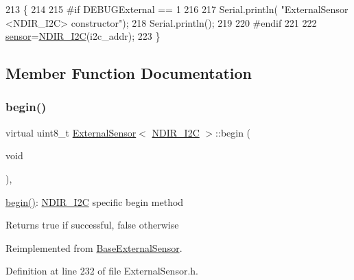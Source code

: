 \begin{DoxyCode}
213     \{
214     
215 \textcolor{preprocessor}{    #if DEBUGExternal == 1 }
216 
217         Serial.println( \textcolor{stringliteral}{"ExternalSensor <NDIR\_I2C> constructor"});
218         Serial.println();
219     
220 \textcolor{preprocessor}{    #endif}
221 
222         \hyperlink{class_external_sensor_3_01_n_d_i_r___i2_c_01_4_ae541c9cece7c38674b70114cdb74a7dc}{sensor}=\hyperlink{class_n_d_i_r___i2_c}{NDIR\_I2C}(i2c\_addr);
223     \}
\end{DoxyCode}


\subsection{Member Function Documentation}
\mbox{\label{class_external_sensor_3_01_n_d_i_r___i2_c_01_4_ac6f3614d94968ef0cc11b2b4d69cef03}} 
\subsubsection{\texorpdfstring{begin()}{begin()}}
{\footnotesize\ttfamily virtual uint8\+\_\+t \hyperlink{class_external_sensor}{External\+Sensor}$<$ \hyperlink{class_n_d_i_r___i2_c}{N\+D\+I\+R\+\_\+\+I2C} $>$\+::begin (\begin{DoxyParamCaption}\item[{void}]{ }\end{DoxyParamCaption})\hspace{0.3cm}{\ttfamily [inline]}, {\ttfamily [virtual]}}

\hyperlink{class_external_sensor_3_01_n_d_i_r___i2_c_01_4_ac6f3614d94968ef0cc11b2b4d69cef03}{begin()}\+: \hyperlink{class_n_d_i_r___i2_c}{N\+D\+I\+R\+\_\+\+I2C} specific begin method

\begin{DoxyReturn}{Returns}
true if successful, false otherwise 
\end{DoxyReturn}


Reimplemented from \hyperlink{class_base_external_sensor_a87d132803d4f4fdd4e66332809f0c9a0}{Base\+External\+Sensor}.



Definition at line 232 of file External\+Sensor.\+h.


